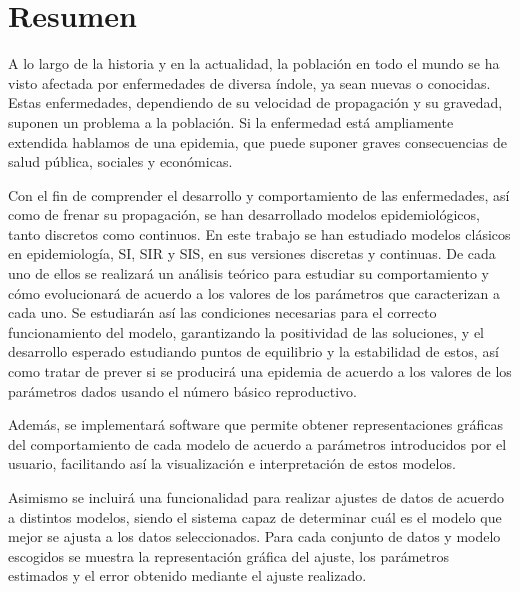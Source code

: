 

\chapter*{Resumen}


A lo largo de la historia y en la actualidad, la población en todo el mundo se ha visto afectada por enfermedades de diversa índole, ya sean nuevas o conocidas. Estas enfermedades, dependiendo de su velocidad de propagación y su gravedad, suponen un problema a la población. Si la enfermedad está ampliamente extendida hablamos de una epidemia, que puede suponer graves consecuencias de salud pública, sociales y económicas.

Con el fin de comprender el desarrollo y comportamiento de las enfermedades, así como de frenar su propagación, se han desarrollado modelos epidemiológicos, tanto discretos como continuos. En este trabajo se han estudiado modelos clásicos en epidemiología, SI, SIR y SIS, en sus versiones discretas y continuas. De cada uno de ellos se realizará un análisis teórico para estudiar su comportamiento y cómo evolucionará de acuerdo a los valores de los parámetros que caracterizan a cada uno. Se estudiarán así las condiciones necesarias para el correcto funcionamiento del modelo, garantizando la positividad de las soluciones, y el desarrollo esperado estudiando puntos de equilibrio y la estabilidad de estos, así como tratar de prever si se producirá una epidemia de acuerdo a los valores de los parámetros dados usando el número básico reproductivo.

Además, se implementará software que permite obtener representaciones gráficas del comportamiento de cada modelo de acuerdo a parámetros introducidos por el usuario, facilitando así la visualización e interpretación de estos modelos.

Asimismo se incluirá una funcionalidad para realizar ajustes de datos de acuerdo a distintos modelos, siendo el sistema capaz de determinar cuál es el modelo que mejor se ajusta a los datos seleccionados. Para cada conjunto de datos y modelo escogidos se muestra la representación gráfica del ajuste, los parámetros estimados y el error obtenido mediante el ajuste realizado.

